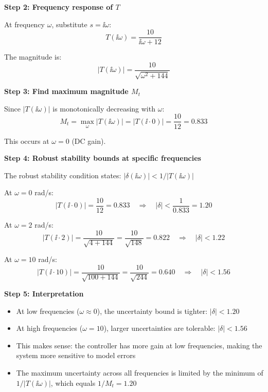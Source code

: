 \documentclass[11pt,a4paper]{article}
\begin{document}
\textbf{Step 2: Frequency response of $T$}

At frequency $\omega$, substitute $s = \ii\omega$:
\begin{equation}
  T(\ii\omega) = \frac{10}{\ii\omega + 12}
\end{equation}

The magnitude is:
\begin{equation}
  |T(\ii\omega)| = \frac{10}{\sqrt{\omega^2 + 144}}
\end{equation}

\textbf{Step 3: Find maximum magnitude $M_t$}

Since $|T(\ii\omega)|$ is monotonically decreasing with $\omega$:
\begin{equation}
  M_t = \max_\omega |T(\ii\omega)| = |T(\ii \cdot 0)| = \frac{10}{12} = 0.833
\end{equation}

This occurs at $\omega = 0$ (DC gain).

\textbf{Step 4: Robust stability bounds at specific frequencies}

The robust stability condition states: $|\delta(\ii\omega)| < 1/|T(\ii\omega)|$

At $\omega = 0$ rad/s:
\begin{equation}
  |T(\ii \cdot 0)| = \frac{10}{12} = 0.833 \quad \Rightarrow \quad |\delta| < \frac{1}{0.833} = 1.20
\end{equation}

At $\omega = 2$ rad/s:
\begin{equation}
  |T(\ii \cdot 2)| = \frac{10}{\sqrt{4 + 144}} = \frac{10}{\sqrt{148}} = 0.822 \quad \Rightarrow \quad |\delta| < 1.22
\end{equation}

At $\omega = 10$ rad/s:
\begin{equation}
  |T(\ii \cdot 10)| = \frac{10}{\sqrt{100 + 144}} = \frac{10}{\sqrt{244}} = 0.640 \quad \Rightarrow \quad |\delta| < 1.56
\end{equation}

\textbf{Step 5: Interpretation}

\begin{itemize}
  \item At low frequencies ($\omega \approx 0$), the uncertainty bound is tighter: $|\delta| < 1.20$
  \item At high frequencies ($\omega = 10$), larger uncertainties are tolerable: $|\delta| < 1.56$
  \item This makes sense: the controller has more gain at low frequencies, making the system more sensitive to model errors
  \item The maximum uncertainty across all frequencies is limited by the minimum of $1/|T(\ii\omega)|$, which equals $1/M_t = 1.20$
\end{itemize}
\end{document}
